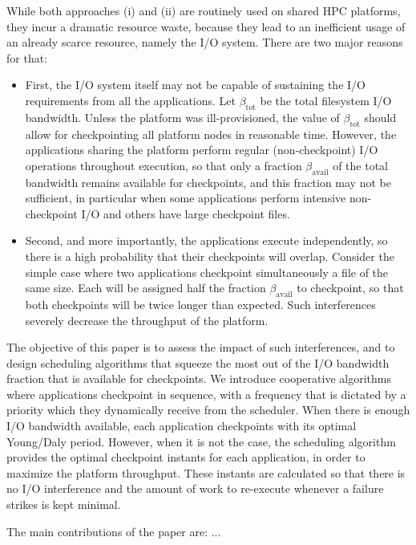\documentclass[conference]{IEEEtran}
\newcommand{\bandtotal}{\beta_{\text{tot}}}
\newcommand{\bandavail}{\beta_{\text{avail}}}
\begin{document}
While both approaches (i) and (ii) are routinely used on shared HPC
platforms, they incur a dramatic resource waste, because they lead to an
inefficient usage of an already scarce resource, namely the I/O system.
There are two major reasons for that:
\begin{itemize}
  \item First, the I/O system itself may not be capable of sustaining
  the I/O requirements from all the applications. Let $\bandtotal$ be
  the total filesystem I/O bandwidth. Unless the platform was
  ill-provisioned, the value of $\bandtotal$ should allow for
  checkpointing all platform nodes in reasonable time. However, the
  applications sharing the platform perform regular (non-checkpoint) I/O
  operations throughout execution, so that only a fraction $\bandavail$
  of the total  bandwidth remains available for checkpoints, and this
  fraction may not be sufficient, in particular when some applications
  perform intensive non-checkpoint I/O and others have large checkpoint
  files.

  \item Second, and more importantly, the applications execute
  independently, so there is a high probability that their checkpoints
  will overlap. Consider the simple case where two applications
  checkpoint simultaneously a file of the same size. Each will be
  assigned half the fraction $\bandavail$ to checkpoint, so that both
  checkpoints will be twice longer than expected. Such interferences
  severely decrease the throughput of the platform.
\end{itemize}

The objective of this paper is to assess the impact of such
interferences, and to design scheduling algorithms that squeeze the most
out of the I/O bandwidth fraction that is available for checkpoints. We introduce
cooperative algorithms where applications checkpoint in sequence, with a
frequency that is dictated by a priority which they dynamically receive from
the scheduler. When there is enough I/O bandwidth available, each
application checkpoints with its optimal Young/Daly period. However, when it is
not the case, the scheduling algorithm provides the optimal checkpoint
instants for each application, in order to maximize the platform
throughput. These instants are calculated so that there is no I/O interference
and the amount of work to re-execute whenever a failure strikes is kept minimal.

The main contributions of the paper are: ...
\end{document}
